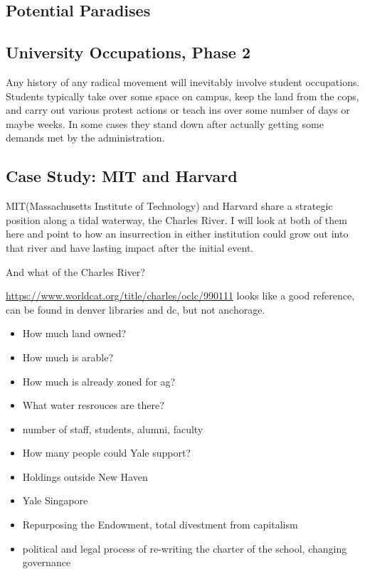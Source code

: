 \subsection{Potential Paradises}\label{potential-paradises}

\subsection{University Occupations, Phase
2}\label{university-occupations-phase-2}

Any history of any radical movement will inevitably involve student
occupations. Students typically take over some space on campus, keep the
land from the cops, and carry out various protest actions or teach ins
over some number of days or maybe weeks. In some cases they stand down
after actually getting some demands met by the administration.

\subsection{Case Study: MIT and
Harvard}\label{case-study-mit-and-harvard}

MIT(Massachusetts Institute of Technology) and Harvard share a strategic
position along a tidal waterway, the Charles River. I will look at both
of them here and point to how an insurrection in either institution
could grow out into that river and have lasting impact after the initial
event.

And what of the Charles River?

\url{https://www.worldcat.org/title/charles/oclc/990111} looks like a
good reference, can be found in denver libraries and dc, but not
anchorage.

\begin{itemize}
\tightlist
\item
  How much land owned?
\item
  How much is arable?
\item
  How much is already zoned for ag?
\item
  What water resrouces are there?
\item
  number of staff, students, alumni, faculty
\item
  How many people could Yale support?
\item
  Holdings outside New Haven
\item
  Yale Singapore
\item
  Repurposing the Endowment, total divestment from capitalism
\item
  political and legal process of re-writing the charter of the school,
  changing governance
\end{itemize}

